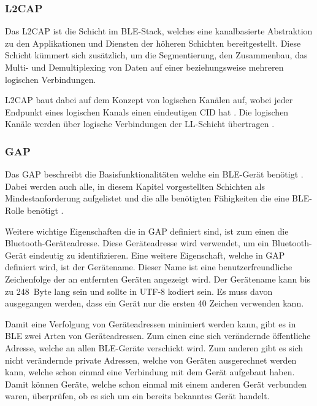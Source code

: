 \subsubsection{\acf{L2CAP}}
Das \acl{L2CAP} ist die Schicht im \ac{BLE}-Stack, welches eine kanalbasierte Abstraktion zu den Applikationen und Diensten der höheren Schichten bereitgestellt. Diese Schicht kümmert sich zusätzlich, um die Segmentierung, den Zusammenbau, das Multi- und Demultiplexing von Daten auf einer beziehungsweise mehreren logischen Verbindungen. \cite[S.~195, S.~1013]{bluetoothCore}

\acl{L2CAP} baut dabei auf dem Konzept von logischen Kanälen auf, wobei jeder Endpunkt eines logischen Kanals einen eindeutigen \ac{CID} hat \cite[S.~1021]{bluetoothCore}. Die logischen Kanäle werden über logische Verbindungen der \ac{LL}-Schicht übertragen \cite[S.~1013]{bluetoothCore}.

\subsubsection{\acf{GAP}}
Das \acl{GAP} beschreibt die Basisfunktionalitäten welche ein \ac{BLE}-Gerät benötigt \cite[S.~207]{bluetoothCore}. Dabei werden auch alle, in diesem Kapitel vorgestellten Schichten als Mindestanforderung aufgelistet und die alle benötigten Fähigkeiten die eine \ac{BLE}-Rolle benötigt \cite[S.~277f., S.~1241]{bluetoothCore}. 

Weitere wichtige Eigenschaften die in \ac{GAP} definiert sind, ist zum einen die Bluetooth-Geräteadresse. Diese Geräteadresse wird verwendet, um ein Bluetooth-Gerät eindeutig zu identifizieren. Eine weitere Eigenschaft, welche in \ac{GAP} definiert wird, ist der Gerätename. Dieser Name ist eine benutzerfreundliche Zeichenfolge der an entfernten Geräten angezeigt wird. Der Gerätename kann bis zu 248~Byte lang sein und sollte in UTF-8 kodiert sein. Es muss davon ausgegangen werden, dass ein Gerät nur die ersten 40 Zeichen verwenden kann. \cite[S.~1251ff.]{bluetoothCore}

Damit eine Verfolgung von Geräteadressen minimiert werden kann, gibt es in \ac{BLE} zwei Arten von Geräteadressen. Zum einen eine sich verändernde öffentliche Adresse, welche an allen \ac{BLE}-Geräte verschickt wird. Zum anderen gibt es sich nicht verändernde private Adressen, welche von Geräten ausgerechnet werden kann, welche schon einmal eine Verbindung mit dem Gerät aufgebaut haben. Damit können Geräte, welche schon einmal mit einem anderen Gerät verbunden waren, überprüfen, ob es sich um ein bereits bekanntes Gerät handelt. \cite[S.~18]{siliconBLE}

